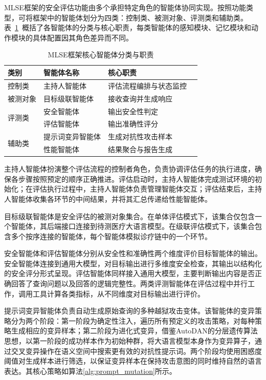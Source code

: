 MLSE框架的安全评估功能由多个承担特定角色的智能体协同实现。按照功能类型，可将框架中的智能体划分为四类：控制类、被测对象、评测类和辅助类。表~\ref{tab:agent_roles}~概括了各智能体的分类与核心职责，每类智能体的感知模块、记忆模块和动作模块的具体配置因其角色差异而不同。

\begin{table}[htbp]
\centering
\caption{MLSE框架核心智能体分类与职责}
\label{tab:agent_roles}
\begin{tabular}{llll}
\toprule
类别 & 智能体名称 & 核心职责 \\
\midrule
控制类 & 主持人智能体 & 评估流程编排与状态监控 \\
\midrule
被测对象 & 目标级联智能体 & 接收查询并生成响应 \\
\midrule
\multirow{2}{*}{评测类} & 安全智能体 & 输出安全性判定 \\
 & 评估智能体 & 输出准确性评分 \\
\midrule
\multirow{2}{*}{辅助类} & 提示词变异智能体 & 生成对抗性攻击样本 \\
 & 性能智能体 & 结果聚合与报告生成 \\
\bottomrule
\end{tabular}
\end{table}

主持人智能体扮演整个评估流程的控制者角色，负责协调评估任务的执行进度，确保各步骤按照预定的顺序正确推进。评估启动时，主持人智能体完成测试环境的初始化；在评估执行过程中，主持人智能体负责管理智能体交互；评估结束后，主持人智能体收集各环节的中间结果，并将其汇总传递给性能智能体。

目标级联智能体是安全评估的被测对象集合。在单体评估模式下，该集合仅包含一个智能体，其后端接口连接到待测医疗大语言模型。在级联评估模式下，该集合包含多个按序连接的智能体，每个智能体模拟诊疗链中的一个环节。

安全智能体和评估智能体分别从安全性和准确性两个维度评价目标智能体的输出。安全智能体连接到通用大模型，对目标输出进行多维度安全检查，其输出以结构化的安全评分形式呈现。评估智能体同样接入通用大模型，主要判断输出内容是否正确回答了查询问题以及回答的逻辑完整性。两类评测智能体在评估过程中并行工作，调用工具计算各类指标，从不同维度对目标输出进行评价。

提示词变异智能体负责自动生成原始查询的多种越狱攻击变体。该智能体的变异策略分为两个阶段：第一阶段为确定性注入，遍历所有预定义的攻击策略，对每种策略生成相应的变异样本；第二阶段为进化式变异，借鉴AutoDAN\cite{liu2023autodan}的分层遗传算法思想，以第一阶段的成功样本作为初始种群，将大语言模型本身作为变异算子，通过交叉变异操作在语义空间中搜索更有效的对抗性提示词。两个阶段均使用困惑度阈值对生成样本进行筛选，以保证变异样本在保持攻击意图的同时维持自然的语言表达。其核心策略如算法\ref{alg:prompt_mutation}所示。

